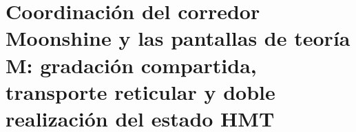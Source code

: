 





\chapter{Coordinación del corredor Moonshine y las pantallas de teoría M: gradación compartida, transporte reticular y doble realización del estado HMT}
\label{chap:sucesor-102-25}
\label{chap:pantallas-teoria-m}


\begin{HMTScientificOwnerSubordinated}

\end{HMTScientificOwnerSubordinated}
\begingroup
\let\HMTTheoryMOriginalSection\section
\let\HMTTheoryMOriginalSubsection\subsection
\def\section[#1]#2{%
  \HMTTheoryMOriginalSection[Extensión operatorial de APP y terna espectral en dimensión 11]{Extensión operatorial de APP y terna espectral de la interfaz supersimétrica en dimensión \texorpdfstring{\(11\)}{11}}%
}
\newcount\HMTTheoryMSubsection
{}
\renewcommand{\subsection}[1]{%
  \advance\HMTTheoryMSubsection by 1
  \ifnum\HMTTheoryMSubsection=1
    \HMTTheoryMOriginalSubsection{Extensión operatorial del estado APP--TRIT--TPK hacia la terna \texorpdfstring{\((\mathcal H_{\mathrm{phys}},H,Q)\)}{(Hphys,H,Q)}}%
  \else
    \HMTTheoryMOriginalSubsection{#1}%
  \fi
}

\endgroup
\begin{HMTScientificOwnerSubordinated}

\end{HMTScientificOwnerSubordinated}













